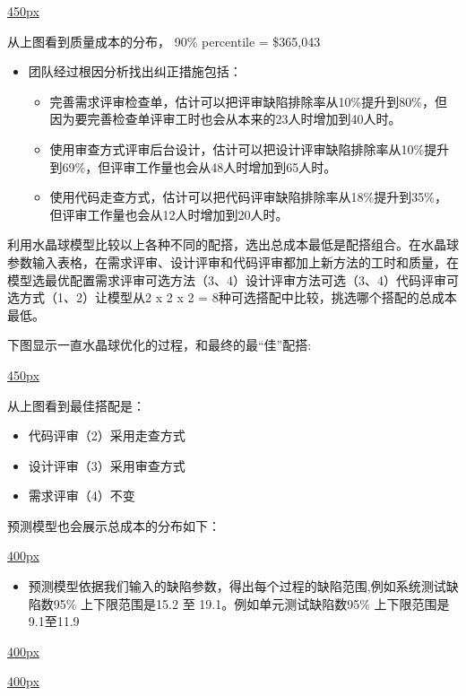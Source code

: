 \documentclass[]{article}
\providecommand{\tightlist}{%
  \setlength{\itemsep}{0pt}\setlength{\parskip}{0pt}}
\begin{document}
\href{文件:startQUA.PNG}{450px}

从上图看到质量成本的分布， 90\% percentile = \$365,043

\begin{itemize}
\tightlist
\item
  团队经过根因分析找出纠正措施包括：

  \begin{itemize}
  \tightlist
  \item
    完善需求评审检查单，估计可以把评审缺陷排除率从10\%提升到80\%，但因为要完善检查单评审工时也会从本来的23人时增加到40人时。
  \item
    使用审查方式评审后台设计，估计可以把设计评审缺陷排除率从10\%提升到69\%，但评审工作量也会从48人时增加到65人时。
  \item
    使用代码走查方式，估计可以把代码评审缺陷排除率从18\%提升到35\%，但评审工作量也会从12人时增加到20人时。
  \end{itemize}
\end{itemize}

利用水晶球模型比较以上各种不同的配搭，选出总成本最低是配搭组合。在水晶球参数输入表格，在需求评审、设计评审和代码评审都加上新方法的工时和质量，在模型选最优配置需求评审可选方法（3、4）设计评审方法可选（3、4）代码评审可选方式（1、2）让模型从2
x 2 x 2 = 8种可选搭配中比较，挑选哪个搭配的总成本最低。

下图显示一直水晶球优化的过程，和最终的最``佳''配搭:

\href{文件:YH.PNG}{450px}

从上图看到最佳搭配是：

\begin{itemize}
\tightlist
\item
  代码评审（2）采用走查方式
\item
  设计评审（3）采用审查方式
\item
  需求评审（4）不变
\end{itemize}

预测模型也会展示总成本的分布如下：

\href{文件:YH-OG.PNG}{400px}

\begin{itemize}
\tightlist
\item
  预测模型依据我们输入的缺陷参数，得出每个过程的缺陷范围,例如系统测试缺陷数95\%
  上下限范围是15.2 至 19.1。例如单元测试缺陷数95\% 上下限范围是9.1至11.9
\end{itemize}

\href{文件:YH-ST.PNG}{400px}

\href{文件:YH-UT.PNG}{400px}
\end{document}
